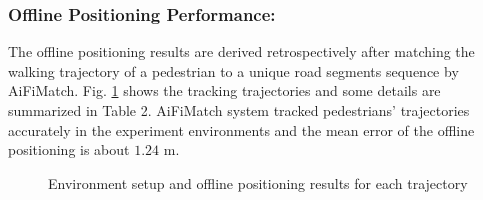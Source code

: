 \documentclass{llncs}
\begin{document}
\subsubsection{Offline Positioning Performance:}

The offline positioning results are derived retrospectively after matching the walking trajectory of a pedestrian to a unique road segments sequence by AiFiMatch. Fig. \ref{fig-envandoffline} shows the tracking trajectories and some details are summarized in Table 2. AiFiMatch system tracked pedestrians' trajectories accurately in the experiment environments and the mean error of the offline positioning is about $1.24$ m.


\vspace{-10pt}
\begin{figure}[!htbp]
	\centering
	\hfil
	\vfil
	\hfil
	\caption{ Environment setup and offline positioning results for each trajectory}
	\label{fig-envandoffline}
\end{figure}
\end{document}
